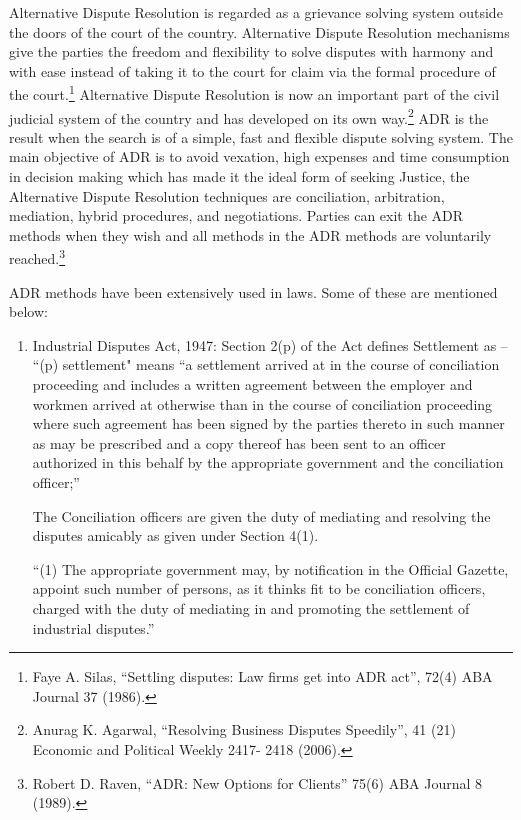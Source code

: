 \begin{multicols}{2}
\noi
Alternative Dispute Resolution is regarded as a grievance solving system outside the doors of
the court of the country. Alternative Dispute Resolution mechanisms give the parties the
freedom and flexibility to solve disputes with harmony and with ease instead of taking it to the court for claim via the formal procedure of the court.\footnote{Faye A. Silas, “Settling disputes: Law firms get into ADR act”, 72(4) ABA Journal 37 (1986).} Alternative Dispute Resolution is now
an important part of the civil judicial system of the country and has developed on its own
way.\footnote{Anurag K. Agarwal, “Resolving Business Disputes Speedily”, 41 (21) Economic and Political Weekly 2417- 2418 (2006).} ADR is the result when the search is of a simple, fast and flexible dispute solving system.
The main objective of ADR is to avoid vexation, high expenses and time consumption in
decision making which has made it the ideal form of seeking Justice, the Alternative Dispute
Resolution techniques are conciliation, arbitration, mediation, hybrid procedures, and
negotiations. Parties can exit the ADR methods when they wish and all methods in the ADR
methods are voluntarily reached.\footnote{Robert D. Raven, “ADR: New Options for Clients” 75(6) ABA Journal 8 (1989).}


\noi
ADR methods have been extensively used in laws. Some of these are mentioned below:

\vspace{-.2cm}

\begin{enumerate}
\itemsep=0pt
\item Industrial Disputes Act, 1947: Section 2(p) of the Act defines Settlement as – “(p)
settlement" means “a settlement arrived at in the course of conciliation proceeding and
includes a written agreement between the employer and workmen arrived at otherwise than in
the course of conciliation proceeding where such agreement has been signed by the parties
thereto in such manner as may be prescribed and a copy thereof has been sent to an officer
authorized in this behalf by the appropriate government and the conciliation officer;”

\noi
The Conciliation officers are given the duty of mediating and resolving the disputes amicably
as given under Section 4(1).

\noi
“(1) The appropriate government may, by notification in the Official Gazette, appoint such
number of persons, as it thinks fit to be conciliation officers, charged with the duty of mediating
in and promoting the settlement of industrial disputes.”


\end{enumerate}
\end{multicols}
